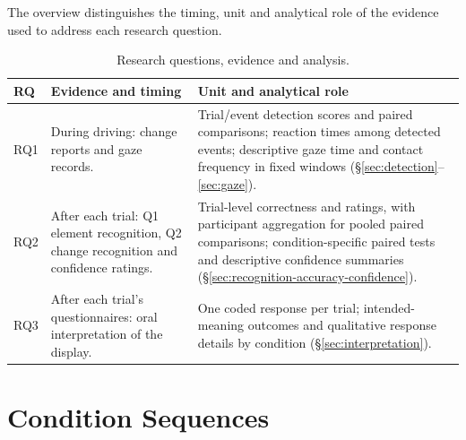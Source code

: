 \documentclass[
english,                 %
bibtex,                  %
includeExtraAbstracts, %
]{kththesis}
\newenvironment{evidenceblock}{\par\addvspace{6pt}\noindent\begin{minipage}{\linewidth}}{\end{minipage}\par\addvspace{6pt}}
\numberwithin{listing}{chapter}
\begin{document}
\begin{evidenceblock}
\normalsize
The overview distinguishes the timing, unit and analytical role of the evidence used to address each research question.

\begin{table}[H]
\centering
\small
\caption[Research questions, evidence and analysis]{Research questions, evidence and analysis.}
\label{tab:rq-evidence-overview}
\renewcommand{\arraystretch}{1.15}
\begin{tabularx}{\linewidth}{@{}p{.08\linewidth} >{\raggedright\arraybackslash}p{.39\linewidth} >{\raggedright\arraybackslash}X@{}}
\toprule
RQ & Evidence and timing & Unit and analytical role \\ \midrule
RQ1 & During driving: change reports and gaze records. & Trial/event detection scores and paired comparisons; reaction times among detected events; descriptive gaze time and contact frequency in fixed windows (\S\ref{sec:detection}--\ref{sec:gaze}). \\
RQ2 & After each trial: Q1 element recognition, Q2 change recognition and confidence ratings. & Trial-level correctness and ratings, with participant aggregation for pooled paired comparisons; condition-specific paired tests and descriptive confidence summaries (\S\ref{sec:recognition-accuracy-confidence}). \\
RQ3 & After each trial's questionnaires: oral interpretation of the display. & One coded response per trial; intended-meaning outcomes and qualitative response details by condition (\S\ref{sec:interpretation}). \\
\bottomrule
\end{tabularx}
\end{table}
\end{evidenceblock}

\section{Condition Sequences}
\label{sec:app-condition-sequences}
\end{document}
